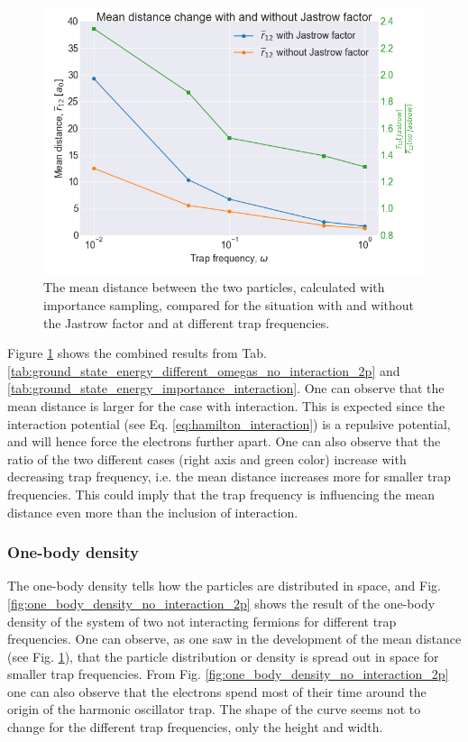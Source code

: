 \begin{figure}[H]
\center
\includegraphics[width=0.7\linewidth]{../Results/mean_distance_change}\caption{The mean distance between the two particles, calculated with importance sampling, compared for the situation with and without the Jastrow factor and at different trap frequencies. }\label{fig:mean_distance_compared}
\end{figure}

Figure \ref{fig:mean_distance_compared} shows the combined results from Tab. \ref{tab:ground_state_energy_different_omegas_no_interaction_2p} and \ref{tab:ground_state_energy_importance_interaction}. One can observe that the mean distance is larger for the case with interaction. This is expected since the interaction potential (see Eq. \ref{eq:hamilton_interaction}) is a repulsive potential, and will hence force the electrons further apart. One can also observe that the ratio of the two different cases (right axis and green color) increase with decreasing trap frequency, i.e. the mean distance increases more for smaller trap frequencies. This could imply that the trap frequency is influencing the mean distance even more than the inclusion of interaction.

\subsubsection{One-body density}

The one-body density tells how the particles are distributed in space, and Fig. \ref{fig:one_body_density_no_interaction_2p} shows the result of the one-body density of the system of two not interacting fermions for different trap frequencies. One can observe, as one saw in the development of the mean distance (see Fig. \ref{fig:mean_distance_compared}), that the particle distribution or density is spread out in space for smaller trap frequencies. From Fig. \ref{fig:one_body_density_no_interaction_2p} one can also observe that the electrons spend most of their time around the origin of the harmonic oscillator trap. The shape of the curve seems not to change for the different trap frequencies, only the height and width.

